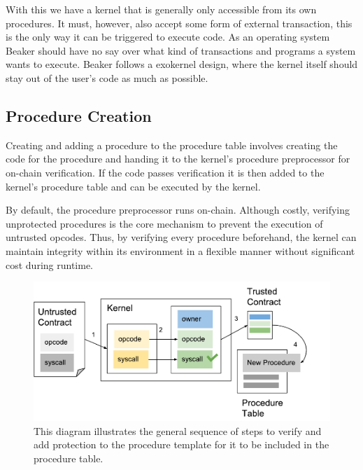 \documentclass[english,a4paper]{article}
\begin{document}
With this we have a kernel that is generally only accessible from its
own procedures. It must, however, also accept some form of external
transaction, this is the only way it can be triggered to execute code.
As an operating system Beaker should have no say over what kind of
transactions and programs a system wants to execute. Beaker follows a
exokernel design, where the kernel itself should stay out of the user's
code as much as possible.

\subsection{Procedure Creation}\label{procedure-creation}
Creating and adding a procedure to the procedure table involves creating
the code for the procedure and handing it to the kernel's procedure
preprocessor for on-chain verification. If the code passes verification
it is then added to the kernel's procedure table and can be executed by
the kernel.

By default, the procedure preprocessor runs on-chain. Although costly,
verifying unprotected procedures is the core mechanism to prevent the
execution of untrusted opcodes. Thus, by verifying every procedure
beforehand, the kernel can maintain integrity within its environment in
a flexible manner without significant cost during runtime.

\begin{figure}[htbp]
\centering
\includegraphics[width=1\textwidth]{media/ProcedureCreation.pdf}
\caption{This diagram illustrates the general sequence of steps to
verify and add protection to the procedure template for it to be
included in the procedure table.}
\end{figure}
\end{document}
